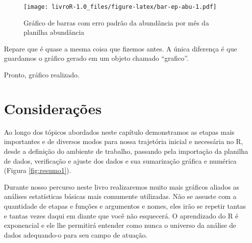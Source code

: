 \documentclass[titlepage, oneside, openany, a4paper]{book}
\newenvironment{Shaded}{\begin{snugshade}}{\end{snugshade}}
\newcommand{\DataTypeTok}[1]{\textcolor[rgb]{0.13,0.29,0.53}{#1}}
\newcommand{\DecValTok}[1]{\textcolor[rgb]{0.00,0.00,0.81}{#1}}
\newcommand{\KeywordTok}[1]{\textcolor[rgb]{0.13,0.29,0.53}{\textbf{#1}}}
\newcommand{\NormalTok}[1]{#1}
\newcommand{\OperatorTok}[1]{\textcolor[rgb]{0.81,0.36,0.00}{\textbf{#1}}}
\newcommand{\StringTok}[1]{\textcolor[rgb]{0.31,0.60,0.02}{#1}}
\begin{document}
\begin{Shaded}
\end{Shaded}

\begin{figure}
\centering
\texttt{[image: livroR-1.0\_files/figure-latex/bar-ep-abu-1.pdf]}
\caption{\label{fig:bar-ep-abu}Gráfico de barras com erro padrão da abundância por mês da planilha abundância}
\end{figure}

Repare que é quase a mesma coisa que fizemos antes. A única diferença é que guardamos o gráfico gerado em um objeto chamado ``grafico''.

Pronto, gráfico realizado.

\hypertarget{considerauxe7uxf5es}{%
\section{Considerações}\label{considerauxe7uxf5es}}

Ao longo dos tópicos abordados neste capítulo demonstramos as etapas mais importantes e de diversos modos para nossa trajetória inicial e necessária no R, desde a definição do ambiente de trabalho, passando pela importação da planilha de dados, verificação e ajuste dos dados e sua sumarização gráfica e numérica (Figura \ref{fig:resumo1}).

Durante nosso percurso neste livro realizaremos muito mais gráficos aliados as análises estatísticas básicas mais comumente utilizadas. Não se assuste com a quantidade de etapas e funções e argumentos e nomes, eles irão se repetir tantas e tantas vezes daqui em diante que você não esquecerá. O aprendizado do R é exponencial e ele lhe permitirá entender como nunca o universo da análise de dados adequando-o para seu campo de atuação.
\end{document}
